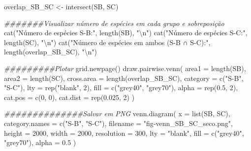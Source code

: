 \documentclass[
  letterpaper,
  DIV=11,
  numbers=noendperiod]{scrartcl}
\newenvironment{Shaded}{}{}
\newcommand{\AttributeTok}[1]{\textcolor[rgb]{0.49,0.56,0.16}{#1}}
\newcommand{\DecValTok}[1]{\textcolor[rgb]{0.25,0.63,0.44}{#1}}
\newcommand{\DocumentationTok}[1]{\textcolor[rgb]{0.73,0.13,0.13}{\textit{#1}}}
\newcommand{\FloatTok}[1]{\textcolor[rgb]{0.25,0.63,0.44}{#1}}
\newcommand{\FunctionTok}[1]{\textcolor[rgb]{0.02,0.16,0.49}{#1}}
\newcommand{\NormalTok}[1]{#1}
\newcommand{\OtherTok}[1]{\textcolor[rgb]{0.00,0.44,0.13}{#1}}
\newcommand{\SpecialCharTok}[1]{\textcolor[rgb]{0.25,0.44,0.63}{#1}}
\newcommand{\StringTok}[1]{\textcolor[rgb]{0.25,0.44,0.63}{#1}}
\begin{document}
\begin{Shaded}
\begin{Highlighting}[numbers=left,,]
\NormalTok{overlap\_SB\_SC }\OtherTok{\textless{}{-}} \FunctionTok{intersect}\NormalTok{(SB, SC)}

\DocumentationTok{\#\#\#\#\#\#\#Visualizar número de espécies em cada grupo e sobreposição}
\FunctionTok{cat}\NormalTok{(}\StringTok{"Número de espécies S{-}B:"}\NormalTok{, }\FunctionTok{length}\NormalTok{(SB), }\StringTok{"}\SpecialCharTok{\textbackslash{}n}\StringTok{"}\NormalTok{)}
\FunctionTok{cat}\NormalTok{(}\StringTok{"Número de espécies S{-}C:"}\NormalTok{, }\FunctionTok{length}\NormalTok{(SC), }\StringTok{"}\SpecialCharTok{\textbackslash{}n}\StringTok{"}\NormalTok{)}
\FunctionTok{cat}\NormalTok{(}\StringTok{"Número de espécies em ambos (S{-}B ∩ S{-}C):"}\NormalTok{, }\FunctionTok{length}\NormalTok{(overlap\_SB\_SC), }\StringTok{"}\SpecialCharTok{\textbackslash{}n}\StringTok{"}\NormalTok{)}

\DocumentationTok{\#\#\#\#\#\#\#\#\#Plotar}
\FunctionTok{grid.newpage}\NormalTok{()}
\FunctionTok{draw.pairwise.venn}\NormalTok{(}
  \AttributeTok{area1 =} \FunctionTok{length}\NormalTok{(SB),}
  \AttributeTok{area2 =} \FunctionTok{length}\NormalTok{(SC),}
  \AttributeTok{cross.area =} \FunctionTok{length}\NormalTok{(overlap\_SB\_SC),}
  \AttributeTok{category =} \FunctionTok{c}\NormalTok{(}\StringTok{"S{-}B"}\NormalTok{, }\StringTok{"S{-}C"}\NormalTok{),}
  \AttributeTok{lty =} \FunctionTok{rep}\NormalTok{(}\StringTok{"blank"}\NormalTok{, }\DecValTok{2}\NormalTok{),}
  \AttributeTok{fill =} \FunctionTok{c}\NormalTok{(}\StringTok{"grey40"}\NormalTok{, }\StringTok{"grey70"}\NormalTok{),}
  \AttributeTok{alpha =} \FunctionTok{rep}\NormalTok{(}\FloatTok{0.5}\NormalTok{, }\DecValTok{2}\NormalTok{),}
  \AttributeTok{cat.pos =} \FunctionTok{c}\NormalTok{(}\DecValTok{0}\NormalTok{, }\DecValTok{0}\NormalTok{),}
  \AttributeTok{cat.dist =} \FunctionTok{rep}\NormalTok{(}\FloatTok{0.025}\NormalTok{, }\DecValTok{2}\NormalTok{)}
\NormalTok{)}

\DocumentationTok{\#\#\#\#\#\#\#\#\#\#\#\#\#\#Salvar em PNG}
\FunctionTok{venn.diagram}\NormalTok{(}
  \AttributeTok{x =} \FunctionTok{list}\NormalTok{(SB, SC),}
  \AttributeTok{category.names =} \FunctionTok{c}\NormalTok{(}\StringTok{"S{-}B"}\NormalTok{, }\StringTok{"S{-}C"}\NormalTok{),}
  \AttributeTok{filename =} \StringTok{"fig{-}venn\_SB\_SC\_seco.png"}\NormalTok{,}
  \AttributeTok{height =} \DecValTok{2000}\NormalTok{,}
  \AttributeTok{width =} \DecValTok{2000}\NormalTok{,}
  \AttributeTok{resolution =} \DecValTok{300}\NormalTok{,}
  \AttributeTok{lty =} \StringTok{"blank"}\NormalTok{,}
  \AttributeTok{fill =} \FunctionTok{c}\NormalTok{(}\StringTok{"grey40"}\NormalTok{, }\StringTok{"grey70"}\NormalTok{),}
  \AttributeTok{alpha =} \FloatTok{0.5}
\NormalTok{)}



\end{Highlighting}
\end{Shaded}
\end{document}
